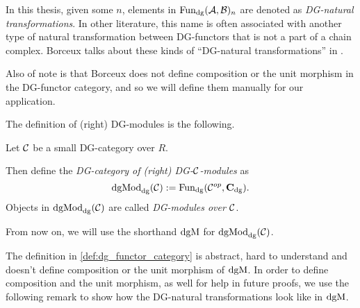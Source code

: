 In this thesis, given some \( n \), elements in \( \operatorname{Fun}_{\operatorname{dg}}({\mathcal{A}}, {\mathcal{B}})_n \) are denoted as \emph{DG-natural transformations}. In other literature, this name is often associated with another type of natural transformation between DG-functors that is not a part of a chain complex. Borceux talks about these kinds of ``DG-natural transformations'' in \cite[Definition 6.2.4]{Borceux_1994}.

Also of note is that Borceux does not define composition or the unit morphism in the DG-functor category, and so we will define them manually for our application.

The definition of (right) DG-modules is the following.

\begin{definition}
    Let \( {\mathcal{C}} \) be a small DG-category over \( R \).

    Then define the \emph{DG-category of (right) DG-\( {\mathcal{C}} \)-modules} as
    \[
        \operatorname{dgMod}_{\operatorname{dg}}({\mathcal{C}}) := \operatorname{Fun}_{\operatorname{dg}}({\mathcal{C}}^{op}, \operatorname{\mathbf{C}}_{\operatorname{dg}}).
    \]
    Objects in \( \operatorname{dgMod}_{\operatorname{dg}}({\mathcal{C}}) \) are called \emph{DG-modules over \( {\mathcal{C}} \)}.

    From now on, we will use the shorthand \( \operatorname{dgM} \) for \( \operatorname{dgMod}_{\operatorname{dg}}({\mathcal{C}}) \).
\end{definition}

The definition in \autoref{def:dg_functor_category} is abstract, hard to understand and doesn't define composition or the unit morphism of \( \operatorname{dgM} \). In order to define composition and the unit morphism, as well for help in future proofs, we use the following remark to show how the DG-natural transformations look like in \( \operatorname{dgM} \).

